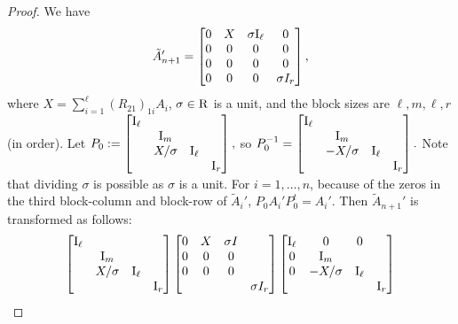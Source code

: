 \begin{proof}
	We have 
	\[
	\tilde A_{n+1}' = \begin{bmatrix}
		0 & X & \sigma  \mathrm{I}_\ell & 0  \\
		0 & 0 & 0 & 0 \\
		0 & 0 & 0 & 0 \\
		0 & 0 & 0 & \sigma I_r
	\end{bmatrix},
	\]
	where $X = \sum_{i=1}^\ell (R_{21})_{1i} A_i$, $\sigma\in\mathrm{R}$ is a unit, and the block sizes are $\ell, m, \ell, r$ (in order).  %
	Let
	$
	P_0 := \begin{bmatrix}
		\mathrm{I}_\ell & \\
		& \mathrm{I}_m &   \\
		& X/\sigma & \mathrm{I}_\ell  \\
		& & & \mathrm{I}_{r}
	\end{bmatrix},
	$
	so 
	$P_0^{-1}=\begin{bmatrix}
		\mathrm{I}_\ell & \\
		& \mathrm{I}_m &   \\
		& -X/\sigma & \mathrm{I}_\ell  \\
		& & & \mathrm{I}_{r}
	\end{bmatrix}.
	$
	Note that dividing $\sigma$ is possible as $\sigma$ is a unit. For $i=1,\dotsc,n$, because of the zeros in the third block-column and block-row of $\tilde A_i'$, $P_0A_i'P_0^t=A_i'$.
	Then $\tilde A_{n+1}'$ is transformed as follows:
	\begin{eqnarray*}
		\begin{bmatrix}
			\IdMat_\ell & \\
			& \IdMat_m &   \\
			& X/\sigma & \IdMat_\ell  \\
			& & & \IdMat_{r}
		\end{bmatrix}
		\begin{bmatrix}
			0 & X & \sigma I \\
			0 & 0 & 0 \\
			0 & 0 & 0 \\
			& & & \sigma I_r
		\end{bmatrix}
		\begin{bmatrix}
			\IdMat_\ell & 0 & 0 \\
			0 &  \IdMat_m &  \\
			0 & -X/\sigma &  \IdMat_\ell \\
			& & & \IdMat_{r}
		\end{bmatrix} \\

\end{eqnarray*}
\end{proof}
